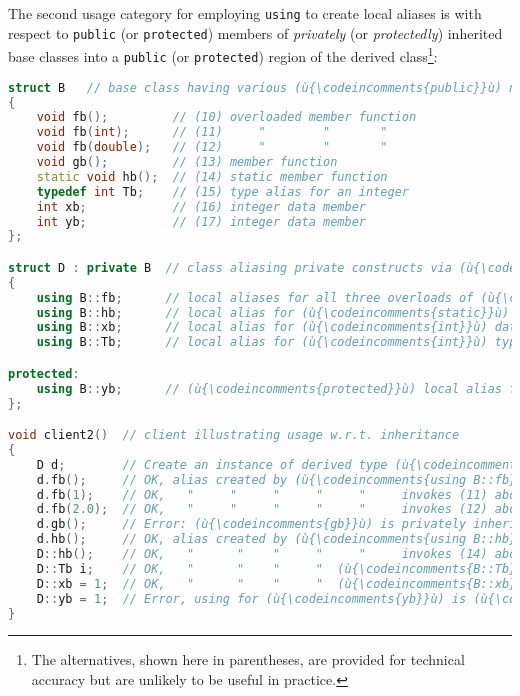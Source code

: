 \noindent The second usage category for employing \texttt{using} to create local
aliases is with respect to \texttt{public} (or \texttt{protected})
members of \emph{privately} (or \emph{protectedly}) inherited base
classes into a \texttt{public} (or \texttt{protected}) region of the
derived class{\cprotect\footnote{The alternatives, shown here in
parentheses, are provided for technical accuracy but are unlikely to
  be useful in practice.}}:

\begin{lstlisting}[language=C++]
struct B   // base class having various (ù{\codeincomments{public}}ù) named entities
{
    void fb();         // (10) overloaded member function
    void fb(int);      // (11)     "        "       "
    void fb(double);   // (12)     "        "       "
    void gb();         // (13) member function
    static void hb();  // (14) static member function
    typedef int Tb;    // (15) type alias for an integer
    int xb;            // (16) integer data member
    int yb;            // (17) integer data member
};

struct D : private B  // class aliasing private constructs via (ù{\codeincomments{using}}ù)
{
    using B::fb;      // local aliases for all three overloads of (ù{\codeincomments{fb}}ù)
    using B::hb;      // local alias for (ù{\codeincomments{static}}ù) member function (ù{\codeincomments{hb}}ù)
    using B::xb;      // local alias for (ù{\codeincomments{int}}ù) data member (ù{\codeincomments{xb}}ù)
    using B::Tb;      // local alias for (ù{\codeincomments{int}}ù) type alias

protected:
    using B::yb;      // (ù{\codeincomments{protected}}ù) local alias for (ù{\codeincomments{int}}ù) data member (ù{\codeincomments{yb}}ù)
};

void client2()  // client illustrating usage w.r.t. inheritance
{
    D d;        // Create an instance of derived type (ù{\codeincomments{D}}ù).
    d.fb();     // OK, alias created by (ù{\codeincomments{using B::fb}}ù)  invokes (10) above.
    d.fb(1);    // OK,   "     "     "     "     "     invokes (11) above.
    d.fb(2.0);  // OK,   "     "     "     "     "     invokes (12) above.
    d.gb();     // Error: (ù{\codeincomments{gb}}ù) is privately inherited without using declaration.
    d.hb();     // OK, alias created by (ù{\codeincomments{using B::hb}}ù)  invokes (14) above.
    D::hb();    // OK,   "      "    "     "     "     invokes (14) above.
    D::Tb i;    // OK,   "      "    "     "  (ù{\codeincomments{B::Tb}}ù)  aliases (15) above.
    D::xb = 1;  // OK,   "      "    "     "  (ù{\codeincomments{B::xb}}ù)  assigns (16) above.
    D::yb = 1;  // Error, using for (ù{\codeincomments{yb}}ù) is (ù{\codeincomments{protected}}ù), not (ù{\codeincomments{public}}ù).
}
\end{lstlisting}
    
